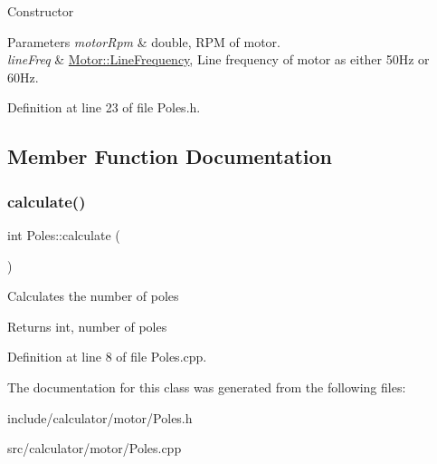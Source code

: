 Constructor 
\begin{DoxyParams}{Parameters}
{\em motor\+Rpm} & double, R\+PM of motor. \\
\hline
{\em line\+Freq} & \hyperlink{class_motor_acee1bdf1b684ad36cb80dc2829d9fcee}{Motor\+::\+Line\+Frequency}, Line frequency of motor as either 50\+Hz or 60\+Hz. \\
\hline
\end{DoxyParams}


Definition at line 23 of file Poles.\+h.



\subsection{Member Function Documentation}
\mbox{\label{class_poles_a23988f68100374c8277dca81ab06f724}} 
\subsubsection{\texorpdfstring{calculate()}{calculate()}}
{\footnotesize\ttfamily int Poles\+::calculate (\begin{DoxyParamCaption}{ }\end{DoxyParamCaption})}

Calculates the number of poles

\begin{DoxyReturn}{Returns}
int, number of poles 
\end{DoxyReturn}


Definition at line 8 of file Poles.\+cpp.



The documentation for this class was generated from the following files\+:\begin{DoxyCompactItemize}
\item 
include/calculator/motor/Poles.\+h\item 
src/calculator/motor/Poles.\+cpp\end{DoxyCompactItemize}

